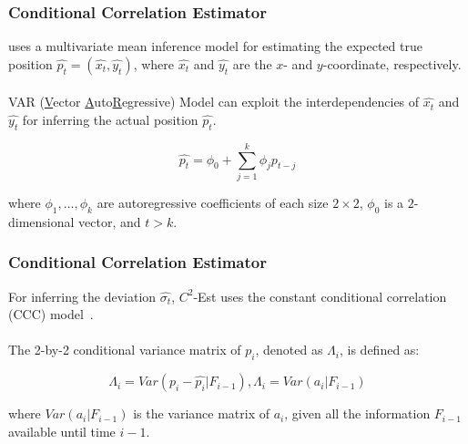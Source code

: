 
\begin{frame}
\frametitle{Conditional Correlation Estimator}

 uses a multivariate mean inference model for estimating the expected true position $\hat{p_t} = (\hat{x_t}, \hat{y_t})$, where $\hat{x_t}$ and $\hat{y_t}$ are the $x$- and $y$-coordinate, respectively.\\~\\

VAR (\underline{V}ector \underline{A}uto\underline{R}egressive) Model can exploit the interdependencies of $\hat{x_t}$ and $\hat{y_t}$ for inferring the actual position $\hat{p_t}$.

\begin{equation}
  \hat{p_t} = \phi_0 + \sum_{j=1}^{k}\phi_j p_{t-j}
\end{equation}

where $\phi_1,...,\phi_k$ are autoregressive coefficients of each size $2 \times 2$, $\phi_0$ is a $2$-dimensional vector, and $t > k$.~\cite{shumway2010time}

\end{frame}


\begin{frame}
\frametitle{Conditional Correlation Estimator}

For inferring the deviation $\hat{\sigma_t}$, $C^2$-Est uses the constant conditional correlation (CCC) model~\cite{bauwens2006multivariate}. \\~\\

The 2-by-2 conditional variance matrix of $p_i$, denoted as $\Lambda_i$, is defined as:

\begin{equation}
  \Lambda_i = Var(p_i - \hat{p_i} | F_{i-1}), \Lambda_i = Var(a_i | F_{i-1})
  \label{equation:variance_matrix}
\end{equation}

where $Var(a_i | F_{i-1})$ is the variance matrix of $a_i$, given all the information $F_{i-1}$ available until time $i-1$.

\end{frame}


